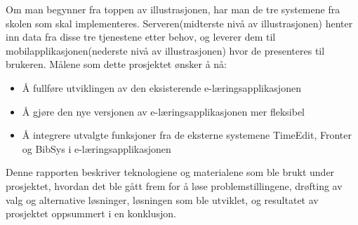 \documentclass[../main.tex]{subfiles}
\begin{document}
Om man begynner fra toppen av illustrasjonen, har man de tre systemene fra skolen som skal implementeres. Serveren(midterste nivå av illustrasjonen) henter inn data fra disse tre tjenestene etter behov, og leverer dem til mobilapplikasjonen(nederste nivå av illustrasjonen) hvor de presenteres til brukeren.\newline
\newline
Målene som dette prosjektet ønsker å nå:
\begin{itemize}
\item Å fullføre utviklingen av den eksisterende e-læringsapplikasjonen
\item Å gjøre den nye versjonen av e-læringsapplikasjonen mer fleksibel
\item Å integrere utvalgte funksjoner fra de eksterne systemene TimeEdit, Fronter og BibSys i e-læringsapplikasjonen
\end{itemize}
Denne rapporten beskriver teknologiene og materialene som ble brukt under prosjektet, hvordan det ble gått frem for å løse problemstillingene, drøfting av valg og alternative løsninger, løsningen som ble utviklet, og resultatet av prosjektet oppsummert i en konklusjon.

\newpage
\end{document}
